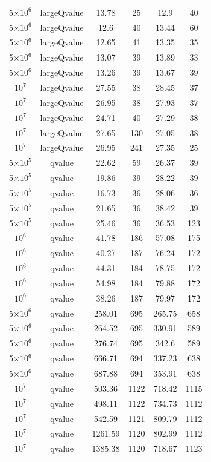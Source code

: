 \documentclass{amsart}
\begin{document}
\begin{center}
\begin{longtable}{cccccc}
    5$\times10^{6}$ & largeQvalue & 13.78 & 25 & 12.9 & 40\\
    5$\times10^{6}$ & largeQvalue & 12.6 & 40 & 13.44 & 60\\
    5$\times10^{6}$ & largeQvalue & 12.65 & 41 & 13.35 & 35\\
    5$\times10^{6}$ & largeQvalue & 13.07 & 39 & 13.89 & 33\\
    5$\times10^{6}$ & largeQvalue & 13.26 & 39 & 13.67 & 39\\
    $10^{7}$ & largeQvalue & 27.55 & 38 & 28.45 & 37\\
    $10^{7}$ & largeQvalue & 26.95 & 38 & 27.93 & 37\\
    $10^{7}$ & largeQvalue & 24.71 & 40 & 27.29 & 38\\
    $10^{7}$ & largeQvalue & 27.65 & 130 & 27.05 & 38\\
    $10^{7}$ & largeQvalue & 26.95 & 241 & 27.35 & 25\\
    5$\times10^{5}$ & qvalue & 22.62 & 59 & 26.37 & 39\\
    5$\times10^{5}$ & qvalue & 19.86 & 39 & 28.22 & 39\\
    5$\times10^{5}$ & qvalue & 16.73 & 36 & 28.06 & 36\\
    5$\times10^{5}$ & qvalue & 21.65 & 36 & 38.42 & 39\\
    5$\times10^{5}$ & qvalue & 25.46 & 36 & 36.53 & 123\\
    $10^{6}$ & qvalue & 41.78 & 186 & 57.08 & 175\\
    $10^{6}$ & qvalue & 40.27 & 187 & 76.24 & 172\\
    $10^{6}$ & qvalue & 44.31 & 184 & 78.75 & 172\\
    $10^{6}$ & qvalue & 54.98 & 184 & 79.88 & 172\\
    $10^{6}$ & qvalue & 38.26 & 187 & 79.97 & 172\\
    5$\times10^{6}$ & qvalue & 258.01 & 695 & 265.75 & 658\\
    5$\times10^{6}$ & qvalue & 264.52 & 695 & 330.91 & 589\\
    5$\times10^{6}$ & qvalue & 276.74 & 695 & 342.6 & 589\\
    5$\times10^{6}$ & qvalue & 666.71 & 694 & 337.23 & 638\\
    5$\times10^{6}$ & qvalue & 687.88 & 694 & 353.91 & 638\\
    $10^{7}$ & qvalue & 503.36 & 1122 & 718.42 & 1115\\
    $10^{7}$ & qvalue & 498.11 & 1122 & 734.73 & 1112\\
    $10^{7}$ & qvalue & 542.59 & 1121 & 809.79 & 1112\\
    $10^{7}$ & qvalue & 1261.59 & 1120 & 802.99 & 1112\\
    $10^{7}$ & qvalue & 1385.38 & 1120 & 718.67 & 1123\\
  \end{longtable}
\end{center}
\end{document}
